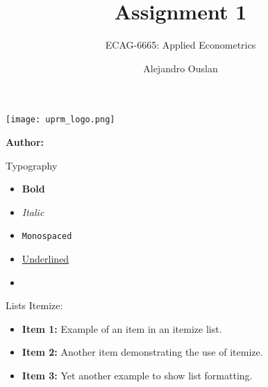 \documentclass[12pt]{beamer}
\title[]{Assignment 1}
\subtitle{ECAG-6665: Applied Econometrics}
\author[Name Surname]{Alejandro Ouslan}
\institute[UPR.png]{University of Puerto Rico}
\date{} %
\begin{document}
\begin{frame}{}
	\vspace{\fill}

	\texttt{[image: uprm\_logo.png]}

	\vspace{\fill}

	\Large
	\color{main}
	\inserttitle

	\medskip

	\large
	\color{black}
	\insertsubtitle

	\vspace{\fill}

	\footnotesize
	\insertinstitute

	\vspace{\fill}

	\textbf{Author:} \insertauthor

	\medskip

	\insertdate

	\vspace{\fill}
\end{frame}

\begin{frame}[allowframebreaks]{Typography}
	\begin{itemize}
		\item \textbf{Bold}
		\item \textit{Italic}
		\item \texttt{Monospaced}
		\item \underline{Underlined}
		\item \href{https://example.com/}{\underline{\color{main}{Link}}}
	\end{itemize}
\end{frame}

\begin{frame}[allowframebreaks]{Lists}
	Itemize:

	\begin{itemize}
		\item \textbf{Item 1:} Example of an item in an itemize list.
		\item \textbf{Item 2:} Another item demonstrating the use of itemize.
		\item \textbf{Item 3:} Yet another example to show list formatting.
	\end{itemize}
\end{frame}
\end{document}
